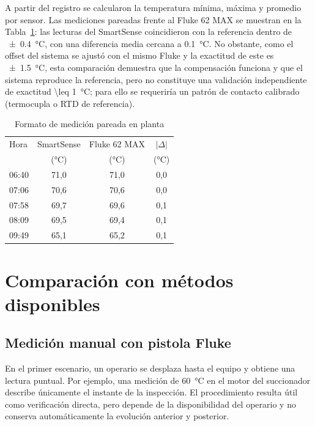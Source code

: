 \documentclass[conference]{IEEEtran}
\begin{document}
A partir del registro se calcularon la temperatura mínima, máxima y promedio por sensor. Las mediciones pareadas frente al Fluke 62 MAX se muestran en la Tabla~\ref{tab:mediciones}: las lecturas del SmartSense coincidieron con la referencia dentro de \SI{\pm 0.4}{\celsius}, con una diferencia media cercana a \SI{0.1}{\celsius}. No obstante, como el offset del sistema se ajustó con el mismo Fluke y la exactitud de este es \SI{\pm 1.5}{\celsius}, esta comparación demuestra que la compensación funciona y que el sistema reproduce la referencia, pero no constituye una validación independiente de exactitud \SI{\leq 1}{\celsius}; para ello se requeriría un patrón de contacto calibrado (termocupla o RTD de referencia).

\begin{table}[!t]
\caption{Formato de medición pareada en planta}
\label{tab:mediciones}
\centering
\footnotesize
\begin{tabular}{@{}lccc@{}}
\toprule
Hora & SmartSense & Fluke 62 MAX & $|\Delta|$ \\
 & (\si{\celsius}) & (\si{\celsius}) & (\si{\celsius}) \\
\midrule
06:40 & 71,0 & 71,0 & 0,0 \\
07:06 & 70,6 & 70,6 & 0,0 \\
07:58 & 69,7 & 69,6 & 0,1 \\
08:09 & 69,5 & 69,4 & 0,1 \\
09:49 & 65,1 & 65,2 & 0,1 \\
\bottomrule
\end{tabular}
\end{table}

\section{Comparación con métodos disponibles}

\subsection{Medición manual con pistola Fluke}

En el primer escenario, un operario se desplaza hasta el equipo y obtiene una lectura puntual. Por ejemplo, una medición de \SI{60}{\celsius} en el motor del succionador describe únicamente el instante de la inspección. El procedimiento resulta útil como verificación directa, pero depende de la disponibilidad del operario y no conserva automáticamente la evolución anterior y posterior.
\end{document}

